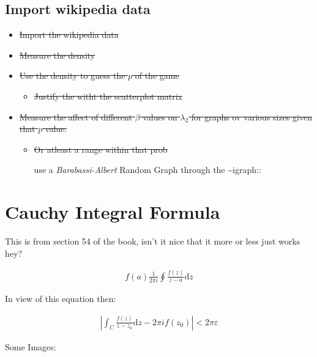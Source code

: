 \documentclass[11pt]{article}
\begin{document}
\subsection{Import wikipedia data}
\label{sec:orge591e70}
\begin{itemize}
\item \sout{Import the wikipedia data}
\item \sout{Measure the density}
\item \sout{Use the density to guess the \(p\) of the game}
\begin{itemize}
\item \sout{Justify the witht the scatterplot matrix}
\end{itemize}
\item \sout{Measure the affect of different \(\beta\) values on \(\lambda_2\) for graphs ov various sizes given that \(p\) value.}
\begin{itemize}
\item \sout{Or atleast a range within that prob}

use a \emph{Barabassi-Albert} Random Graph through the \textasciitilde{}igraph::
\end{itemize}
\end{itemize}

\section{Cauchy Integral Formula}
\label{cauchy-integral-formula}
This is from section 54 of the book, isn't it nice that it more or less
just works hey? \cite{zhangMakingEigenvectorBasedReputation2004}

\begin{align}
f\left( a \right) \frac{1}{2\pi i} \oint \frac{f\left( z \right)}{z- a}\mathrm{d}z
\end{align}

In view of this equation then: \cite{zhangMakingEigenvectorBasedReputation2004}

$$\begin{aligned}
\left| \int_C \frac{f\left( z \right)}{z- z_0} \mathrm{d}z - 2 \pi i f\left( z_0 \right) \right|<2 \pi \varepsilon
\end{aligned}$$

Some Images: \cite{ngStableAlgorithmsLink2001}
\end{document}

